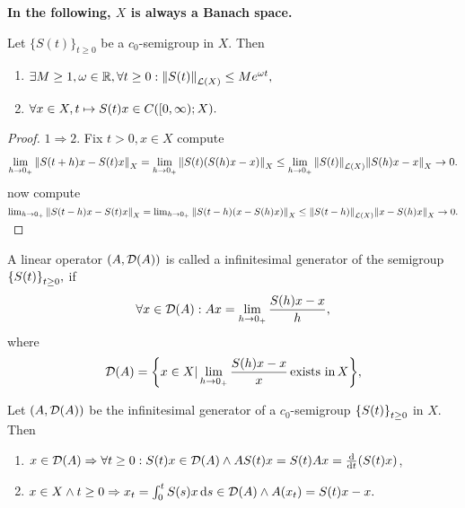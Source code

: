 \documentclass{article}
\begin{document}
\begin{remark}[$X$ = Banach]
	\textbf{In the following, $X$ is always a Banach space.}
\end{remark}
\begin{lemma}
	Let $\{S(t)\}_{t\geq0}$ be a $c_0$-semigroup in $X$. Then 
	\begin{enumerate}
		\item $\exists M \geq 1, \omega \in {\mathbb R}, \forall t \geq 0: \norm{S(t)}_{\mathcal{L}\qty(X)} \leq M e^{\omega t},$
		\item $\forall x \in X, t \mapsto S(t)x \in C\qty([0,\infty);X).$
	\end{enumerate}
\end{lemma}
\begin{proof}
	$1 \Rightarrow 2.$ Fix $t > 0, x \in X$ compute
	\[
		\lim_{h\to 0_+} \norm{S\qty(t+h)x - S(t)x}_X = \lim_{h \to 0_+} \norm{S(t)\qty(S(h)x - x)}_X \leq \lim_{h\to 0_+}\norm{S(t)}_{\mathcal{L}\qty(X)}\norm{S(h)x - x}_{X} \to 0.
	\]
	now compute $\lim_{h\to 0_+}\norm{S(t-h)x - S(t)x}_{X} = \lim_{h \to 0_+}\norm{S(t-h)(x-S(h)x)}_X \leq \norm{S(t-h)}_{\mathcal{L}(X)}\norm{x-S(h)x}_X \to 0.$
\end{proof}


\begin{definition}
	A linear operator $\qty(A, \mathcal{D}\qty(A))$ is called a infinitesimal generator of the semigroup $\qty{S(t)}_{t\geq 0},$ if
	\[
		\forall x \in \mathcal{D}\qty(A): Ax = \lim_{h \to 0_+} \frac{S(h)x - x}{h},
	\]
	where 
	\[
		\mathcal{D}\qty(A) = \qty{ x \in X | \lim_{h\to0_+} \frac{S(h)x-x}{x} \, \text{exists in} \, X},
	\]
\end{definition}

\begin{theorem}
	Let $\qty(A, \mathcal{D}\qty(A))$ be the infinitesimal generator of a $c_0$-semigroup $\qty{S(t)}_{t \geq 0}$ in $X$. Then 
	\begin{enumerate}
		\item $x \in \mathcal{D}\qty(A) \Rightarrow \forall t \geq 0: S(t)x \in \mathcal{D}\qty(A) \wedge A S(t) x = S(t) A x = \dv{t}\qty(S(t)x)$,
		\item $x \in X \wedge t\geq 0 \Rightarrow x_t = \int_0^t S(s)x \dd{s} \in \mathcal{D}\qty(A) \wedge A\qty(x_t) = S(t)x -x.$
	\end{enumerate}
\end{theorem}
\end{document}
